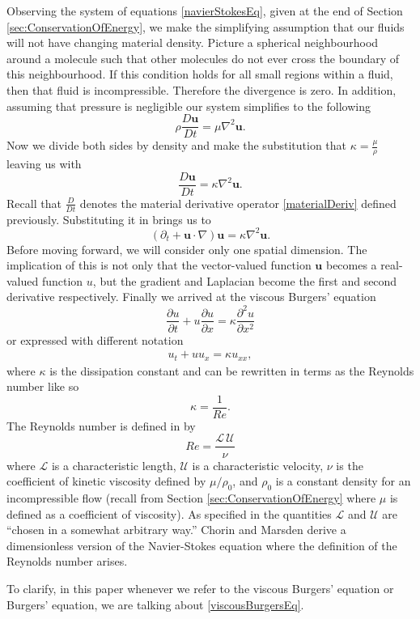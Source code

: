 \documentclass[undefended]{sfuthesis}
\begin{document}
Observing the system of equations \eqref{navierStokesEq}, given at the end of Section \ref{sec:ConservationOfEnergy}, we make the simplifying assumption that our fluids will not have changing material density. Picture a spherical neighbourhood around a molecule such that other molecules do not ever cross the boundary of this neighbourhood. If this condition holds for all small regions within a fluid, then that fluid is incompressible. Therefore the divergence is zero. In addition, assuming that pressure is negligible our system simplifies to the following \[\rho \frac{D\textbf{u}}{Dt} = \mu \nabla^2 \textbf{u}.\] Now we divide both sides by density and make the substitution that $\kappa = \frac{\mu}{\rho}$ leaving us with \[\frac{D\textbf{u}}{Dt} = \kappa \nabla^2 \textbf{u}.\] Recall that $\frac{D}{D t}$ denotes the material derivative operator \eqref{materialDeriv} defined previously. Substituting it in brings us to \[(\partial_t + \textbf{u} \cdot \nabla) \textbf{u} = \kappa \nabla^2 \textbf{u}.\] Before moving forward, we will consider only one spatial dimension. The implication of this is not only that the vector-valued function $\textbf{u}$ becomes a real-valued function $u$, but the gradient and Laplacian become the first and second derivative respectively. Finally we arrived at the viscous Burgers' equation \[\frac{\partial u}{\partial t} + u \frac{\partial u}{\partial x} = \kappa \frac{\partial^2 u}{\partial x^2}\] or expressed with different notation
\begin{align}
u_t + u u_x = \kappa u_{xx}, \label{viscousBurgersEq}
\end{align}
where $\kappa$ is the dissipation constant and can be rewritten in terms as the Reynolds number like so \[\kappa = \frac{1}{Re}.\] The Reynolds number is defined in \cite{mathematicalIntroFluids} by \[Re = \frac{\mathcal{L} \,\mathcal{U}}{\nu}\] where $\mathcal{L}$ is a characteristic length, $\mathcal{U}$ is a characteristic velocity, $\nu$ is the coefficient of kinetic viscosity defined by $\mu/\rho_0$, and $\rho_0$ is a constant density for an incompressible flow (recall from Section \ref{sec:ConservationOfEnergy} where $\mu$ is defined as a coefficient of viscosity). As specified in \cite{mathematicalIntroFluids} the quantities $\mathcal{L}$ and $\mathcal{U}$ are ``chosen in a somewhat arbitrary way.'' Chorin and Marsden derive a dimensionless version of the Navier-Stokes equation where the definition of the Reynolds number arises.

To clarify, in this paper whenever we refer to the viscous Burgers' equation or Burgers' equation, we are talking about \eqref{viscousBurgersEq}.
\end{document}
